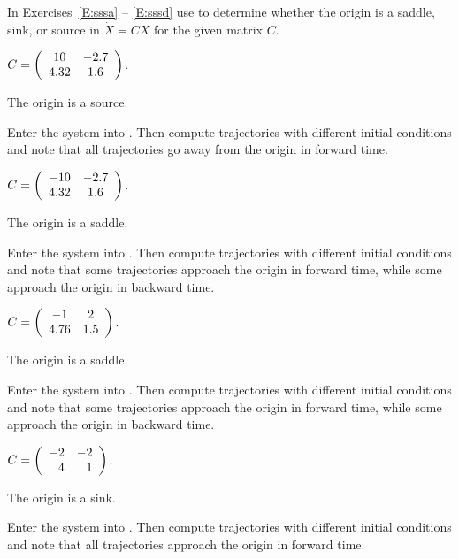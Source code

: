 \documentclass{ximera}
\begin{document}
\noindent In Exercises~\ref{E:sssa} -- \ref{E:sssd} use {\pplane} to
determine whether the origin is a saddle, sink, or source in $\dot{X}=CX$
for the given matrix $C$.
\begin{computerExercise} \label{E:sssa}
$C=\left(\begin{array}{cc} 10 & -2.7\\ 4.32 &1.6\end{array}\right)$.

\begin{solution}
\ans The origin is a source.

\soln Enter the system into {\pplane}.  Then compute trajectories with
different initial conditions and note that all trajectories go away from
the origin in forward time.

\end{solution}
\end{computerExercise}
\begin{computerExercise} \label{E:sssb}
$C=\left(\begin{array}{cc} -10 & -2.7\\ 4.32 &1.6\end{array}\right)$.

\begin{solution}
\ans The origin is a saddle.

\soln Enter the system into {\pplane}.  Then compute trajectories with
different initial conditions and note that some trajectories approach the
origin in forward time, while some approach the origin in backward time.

\end{solution}
\end{computerExercise}
\begin{computerExercise} \label{E:sssc}
$C=\left(\begin{array}{cc} -1 & 2\\ 4.76 &1.5\end{array}\right)$.

\begin{solution}
\ans The origin is a saddle.

\soln Enter the system into {\pplane}.  Then compute trajectories with
different initial conditions and note that some trajectories approach the
origin in forward time, while some approach the origin in backward time.

\end{solution}
\end{computerExercise}
\begin{computerExercise} \label{E:sssd}
$C=\left(\begin{array}{rr} -2 & -2\\ 4 &1\end{array}\right)$.

\begin{solution}
\ans The origin is a sink.

\soln Enter the system into {\pplane}.  Then compute trajectories with
different initial conditions and note that all trajectories approach
the origin in forward time.


\end{solution}
\end{computerExercise}
\end{document}
